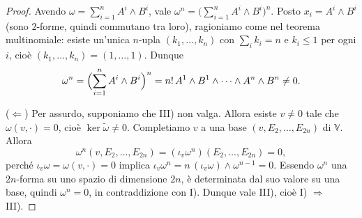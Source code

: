 \begin{proof}
    Avendo $\omega = \sum_{i=1}^n A^i \wedge B^i$, vale
    $\omega^n = \bigl(\sum_{i=1}^n A^i \wedge B^i\bigr)^n$.
    Posto $x_i = A^i\wedge B^i$ (sono $2$-forme, quindi commutano tra loro), ragioniamo come nel teorema multinomiale: esiste un'unica $n$-upla $(k_1,\dots,k_n)$ con $\sum_i k_i = n$ e $k_i \le 1$ per ogni $i$,
    cioè $(k_1,\dots,k_n) = (1,\dots,1)$. Dunque
    \[
        \omega^n = \Bigl(\sum_{i=1}^n A^i\wedge B^i\Bigr)^n
        = n!\, A^1\wedge B^1\wedge \dots \wedge A^n\wedge B^n \neq 0 .
    \]

    \medskip\noindent($\Leftarrow$) Per assurdo, supponiamo che III) non valga. Allora esiste $v\neq 0$
    tale che $\omega(v,\cdot)=0$, cioè $\ker\tilde{\omega}\neq 0$.
    Completiamo $v$ a una base $(v,E_2,\dots,E_{2n})$ di $\mathbb{V}$. Allora
    \[
        \omega^n(v,E_2,\dots,E_{2n}) = (\iota_v\omega^n)(E_2,\dots,E_{2n}) = 0 ,
    \]
    perché $\iota_v\omega = \omega(v,\cdot) = 0$ implica
    $\iota_v\omega^n = n\,(\iota_v\omega)\wedge\omega^{n-1} = 0$.
    Essendo $\omega^n$ una $2n$-forma su uno spazio di dimensione $2n$, è determinata dal suo valore su una base, quindi $\omega^n = 0$, in contraddizione con I).
    Dunque vale III), cioè I) $\Longrightarrow$ III).
\end{proof}

